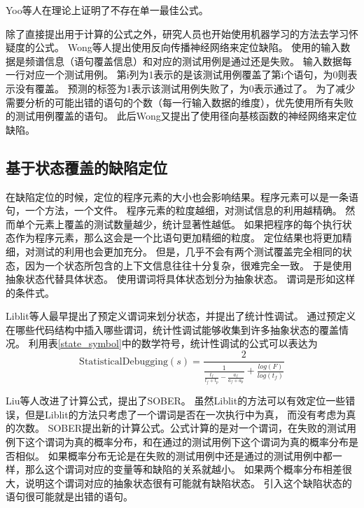 Yoo等人在理论上证明了不存在单一最佳公式\parencite{yoo2014no}。

除了直接提出用于计算的公式之外，研究人员也开始使用机器学习的方法去学习怀疑度的公式。
Wong等人提出使用反向传播神经网络来定位缺陷\parencite{W2009BP}。
使用的输入数据是频谱信息（语句覆盖信息）和对应的测试用例是通过还是失败。
输入数据每一行对应一个测试用例。
第i列为1表示的是该测试用例覆盖了第i个语句，为0则表示没有覆盖。
预测的标签为1表示该测试用例失败了，为0表示通过了。
为了减少需要分析的可能出错的语句的个数（每一行输入数据的维度），优先使用所有失败的测试用例覆盖的语句。
此后Wong又提出了使用径向基核函数的神经网络来定位缺陷\parencite{Wong2012Effective}。

\subsection{基于状态覆盖的缺陷定位}

在缺陷定位的时候，定位的程序元素的大小也会影响结果。程序元素可以是一条语句，一个方法，一个文件。
程序元素的粒度越细，对测试信息的利用越精确。
然而单个元素上覆盖的测试数量越少，统计显著性越低。
如果把程序的每个执行状态作为程序元素，那么这会是一个比语句更加精细的粒度。
定位结果也将更加精细，对测试的利用也会更加充分。
但是，几乎不会有两个测试覆盖完全相同的状态，因为一个状态所包含的上下文信息往往十分复杂，很难完全一致。
于是使用抽象状态代替具体状态。
使用谓词将具体状态划分为抽象状态。
谓词是形如这样的条件式。

Liblit等人最早提出了预定义谓词来划分状态\parencite{Liblit2005Scalable}，并提出了统计性调试。
通过预定义在哪些代码结构中插入哪些谓词，统计性调试能够收集到许多抽象状态的覆盖情况。
利用表\ref{state_symbol}中的数学符号，统计性调试的公式可以表达为
$$
\mathrm{StatisticalDebugging}(s) = \frac{2}{\frac{1}{\frac{t_f}{t_f + t_p} - \frac{a_f}{a_f + a_p}} + \frac{log(F)}{log(t_f)}}
$$

Liu等人改进了计算公式，提出了SOBER\parencite{Liu2006Statistical}。
虽然Liblit的方法可以有效定位一些错误，但是Liblit的方法只考虑了一个谓词是否在一次执行中为真，
而没有考虑为真的次数。
SOBER提出新的计算公式。公式计算的是对一个谓词，在失败的测试用例下这个谓词为真的概率分布，和在通过的测试用例下这个谓词为真的概率分布是否相似。
如果概率分布无论是在失败的测试用例中还是通过的测试用例中都一样，那么这个谓词对应的变量等和缺陷的关系就越小。
如果两个概率分布相差很大，说明这个谓词对应的抽象状态很有可能就有缺陷状态。
引入这个缺陷状态的语句很可能就是出错的语句。

